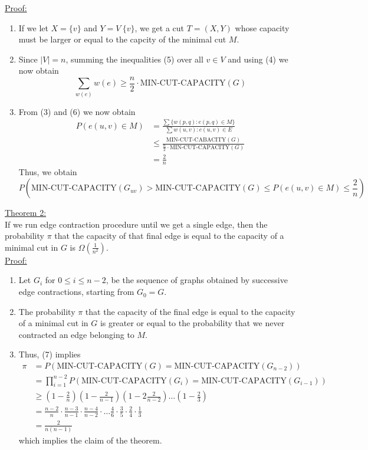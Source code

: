 \documentclass[12pt, letterpaper]{article}
\begin{document}
\underline{Proof:}\\
\begin{enumerate}
    \item If we let $X = \{v\}$ and $Y = V\ \{v\}$, we get a cut $T = (X, Y)$ whose capacity must be larger or equal to the capcity of the minimal cut $M$.
    \item Since $|V| = n$, summing the inequalities (5) over all $v\in V$ and using (4) we now obtain\begin{equation}
        \sum_{w(e)}w(e)\geq \frac{n}{2}\cdot \text{MIN-CUT-CAPACITY}(G)
    \end{equation}
    \item From (3) and (6) we now obtain \begin{align*}
        P(e(u, v)\in M) &= \frac{\sum\{w(p, q) : e(p, q)\in M\}}{\sum w(u, v) : e(u, v)\in E}\\
        &\leq \frac{\text{MIN-CUT-CABACITY}(G)}{\frac{n}{2}\cdot \text{MIN-CUT-CAPACITY}(G)}\\
        &=\frac{2}{n}
    \end{align*}
    Thus, we obtain \begin{equation}
        P(\text{MIN-CUT-CAPACITY}(G_{uv}) > \text{MIN-CUT-CAPACITY}(G)\leq P(e(u, v)\in M)\leq \frac{2}{n})
    \end{equation}
\end{enumerate}
\underline{Theorem 2:}\\
If we run edge contraction procedure until we get a single edge, then the probability $\pi$ that the capacity of that final edge is equal to the capacity of a minimal cut in $G$ is $\Omega(\frac{1}{n^2})$.\\
\underline{Proof:}
\begin{enumerate}
    \item Let $G_i$ for $0 \leq i\leq n - 2$, be the sequence of graphs obtained by successive edge contractions, starting from $G_0 = G$.
    \item The probability $\pi$ that the capacity of the final edge is equal to the capacity of a minimal cut in $G$ is greater or equal to the probability that we never contracted an edge belonging to $M$.
    \item Thus, (7) implies \begin{align*}
        \pi &= P(\text{MIN-CUT-CAPACITY}(G) = \text{MIN-CUT-CAPACITY}(G_{n-2}))\\
        &= \prod_{i = 1}^{n - 2} P(\text{MIN-CUT-CAPACITY}(G_i) = \text{MIN-CUT-CAPACITY}(G_{i - 1}))\\
        &\geq (1 - \frac{2}{n})(1-\frac{2}{n - 1})(1 - 2\frac{2}{n - 2})\dots (1- \frac{2}{3})\\
        &= \frac{n - 2}{n}\cdot \frac{n-3}{n - 1}\cdot\frac{n - 4}{n - 2}\cdot \dots \frac{4}{6}\cdot\frac{3}{5}\cdot\frac{2}{4}\cdot\frac{1}{3}\\
        &= \frac{2}{n(n - 1)}
    \end{align*} which implies the claim of the theorem.
\end{enumerate}
\end{document}

